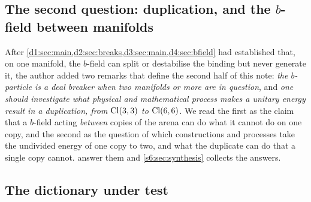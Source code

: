 \subsection{The second question: duplication, and the \texorpdfstring{$b$}{b}-field between manifolds}

After \cref{d1:sec:main,d2:sec:breaks,d3:sec:main,d4:sec:bfield} had established that, on one manifold, the $b$-field can split or destabilise the binding but never
generate it, the author added two remarks that define the second half of this note: \emph{the $b$-particle is a deal breaker when two
manifolds or more are in question}, and \emph{one should investigate what physical and mathematical process makes a unitary energy result
in a duplication, from $\mathrm{Cl}(3,3)$ to $\mathrm{Cl}(6,6)$}. We read the first as the claim that a $b$-field acting \emph{between} copies of the arena
can do what it cannot do on one copy, and the second as the question of which constructions and processes take the undivided energy of
one copy to two, and what the duplicate can do that a single copy cannot.  answer them and
\cref{s6:sec:synthesis} collects the answers.

\subsection{The dictionary under test}

